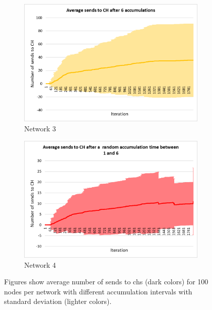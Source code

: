 \documentclass[USenglish]{uit-thesis}
\begin{document}
\begin{figure}
\begin{subfigure}[b]{0.475\textwidth}
            \includegraphics[width=\textwidth]{numSendsCh_stdev_6.png}
            \caption[]%
            {{\small Network 3}}    
            \label{fig:sendchfig3}
        \end{subfigure}
        \quad
        \begin{subfigure}[b]{0.475\textwidth}   
            \centering 
            \includegraphics[width=\textwidth]{numSendsCh_stdev_rand.png}
            \caption[]%
            {{\small Network 4}}    
            \label{fig:sendchfig4}
        \end{subfigure}
        \caption[Figures show average number of sends to \glspl{ch} for 100 nodes per network with different accumulation intervals with standard deviation.]
        {\small Figures show average number of sends to \glspl{ch} (dark colors) for 100 nodes per network with different accumulation intervals with standard deviation (lighter colors).} 
        \label{fig:sendschChart}
    \end{figure}
\end{document}
